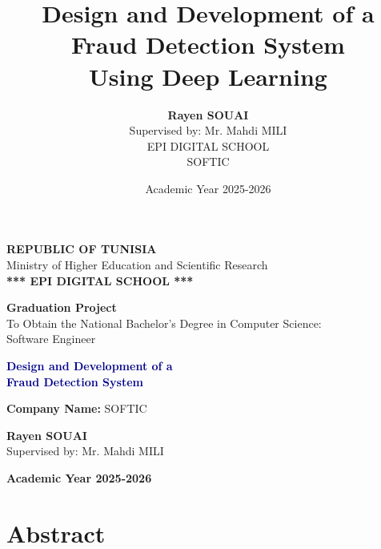 \documentclass[12pt,a4paper,twoside]{report}
\title{
    \textbf{Design and Development of a\\Fraud Detection System}\\
    \vspace{1cm}
    \large Using Deep Learning
}
\author{
    \textbf{Rayen SOUAI}\\
    \vspace{0.5cm}
    Supervised by: Mr. Mahdi MILI\\
    \vspace{1cm}
    EPI DIGITAL SCHOOL\\
    SOFTIC
}
\date{Academic Year 2025-2026}
\begin{document}
\begin{titlepage}
    \centering
    \vspace*{1cm}
    
    {\LARGE \textbf{REPUBLIC OF TUNISIA}}\\
    {\large Ministry of Higher Education and Scientific Research}\\
    \vspace{1cm}
    {\Large \textbf{*** EPI DIGITAL SCHOOL ***}}\\
    
    \vspace{3cm}
    
    {\Large \textbf{Graduation Project}}\\
    \vspace{1cm}
    {\normalsize To Obtain the National Bachelor's Degree in Computer Science:\\
    Software Engineer}
    
    \vspace{3cm}
    
    {\LARGE \textbf{\textcolor{darkblue}{Design and Development of a\\Fraud Detection System}}}\\
    
    \vspace{3cm}
    
    {\textbf{Company Name:} SOFTIC}
    
    \vspace{3cm}
    
    {\large \textbf{Rayen SOUAI}}\\
    \vspace{0.5cm}
    {\large Supervised by: Mr. Mahdi MILI}
    
    \vfill
    
    {\large \textbf{Academic Year 2025-2026}}
\end{titlepage}

\chapter*{Abstract}
\end{document}
